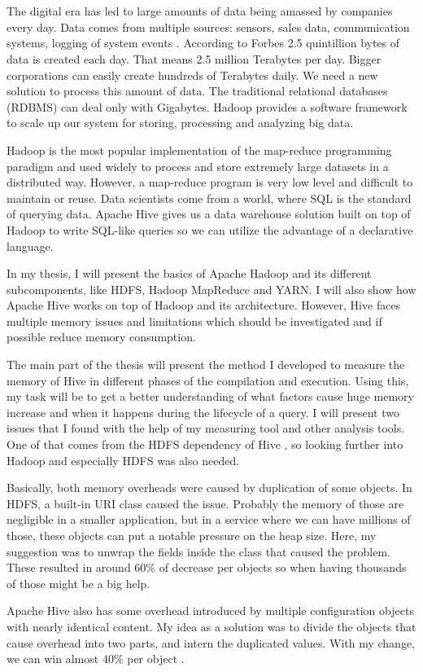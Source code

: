 \chapter{\bevezetes}

The digital era has led to large amounts of data being amassed by companies every day. Data comes from multiple sources: sensors, sales data, communication systems, logging of system events \etc. According to Forbes \cite{Forbes} 2.5 quintillion bytes of data is created each day. That means 2.5 million Terabytes per day. Bigger corporations can easily create hundreds of Terabytes daily. We need a new solution to process this amount of data. The traditional relational databases (RDBMS) can deal only with Gigabytes. Hadoop provides a software framework to scale up our system for storing, processing and analyzing big data.

Hadoop is the most popular implementation of the map-reduce programming paradigm and used widely to process and store extremely large datasets in a distributed way. However, a map-reduce program is very low level and difficult to maintain or reuse. Data scientists come from a world, where SQL is the standard of querying data. Apache Hive gives us a data warehouse solution built on top of Hadoop to write SQL-like queries so we can utilize the advantage of a declarative language.

In my thesis, I will present the basics of Apache Hadoop and its different subcomponents, like HDFS, Hadoop MapReduce and YARN. I will also show how Apache Hive works on top of Hadoop and its architecture. However, Hive faces multiple memory issues and limitations which should be investigated and if possible reduce memory consumption.

The main part of the thesis will present the method  I developed to measure the memory of Hive in different phases of the compilation and execution. Using this, my task will be to get a better understanding of what factors cause huge memory increase and when it happens during the lifecycle of a query. I will present two issues that I found with the help of my measuring tool and other analysis tools. One of that comes from the HDFS dependency of Hive \cite{hdfs-path}, so looking further into Hadoop and especially HDFS was also needed. 


Basically, both memory overheads were caused by duplication of some objects. In HDFS, a built-in URI class caused the issue. Probably the memory of those are negligible in a smaller application, but in a service where we can have millions of those, these objects can put a notable pressure on the heap size. Here, my suggestion was to unwrap the fields inside the class that caused the problem. These resulted in around 60\% of decrease per objects so when having thousands of those might be a big help.

Apache Hive also has some overhead introduced by multiple configuration objects with nearly identical content. My idea as a solution was to divide the objects that cause overhead into two parts, and intern the duplicated values. With my change, we can win almost 40\% per object \cite{hive-conf}.